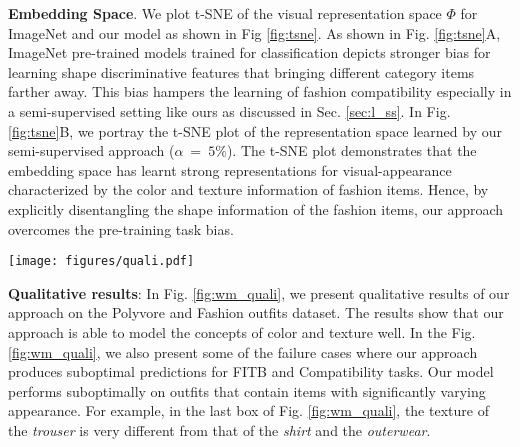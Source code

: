 \documentclass[sigconf]{acmart}
\begin{document}
\noindent \textbf{Embedding Space}. We plot t-SNE \cite{tsne} of the visual representation space $\Phi$ for ImageNet and our model as shown in Fig \ref{fig:tsne}. As shown in Fig. \ref{fig:tsne}{A}, ImageNet pre-trained models trained for classification depicts stronger bias for learning shape discriminative features that bringing different category items farther away. This bias hampers the learning of fashion compatibility especially in a semi-supervised setting like ours as discussed in Sec. \ref{sec:l_ss}. In Fig. \ref{fig:tsne}{B}, we portray the t-SNE plot of the representation space learned by our semi-supervised approach ($\alpha$~=~$5\%$). The t-SNE plot demonstrates that the embedding space has learnt strong representations for visual-appearance characterized by the color and texture information of fashion items. Hence, by explicitly disentangling the shape information of the fashion items, our approach overcomes the pre-training task bias. 

\begin{figure*}[t]
    \centering
    \texttt{[image: figures/quali.pdf]}
    \caption{{\bf Qualitative results on Polyvore and Fashion Outfits datasets}. \textbf{Top three rows} show the results on FITB task. Each box contains a query outfit and four candidate choices. Green and red boxes indicates correct and incorrect predictions of our model, respectively. \textbf{Bottom three rows} show the results on compatibility tasks. Some of the failure cases of our model are highlighted with a red box.}
    \label{fig:wm_quali}
\end{figure*}

\vspace{1mm}
\noindent \textbf{Qualitative results}: In Fig. \ref{fig:wm_quali}, we present qualitative results of our approach on the Polyvore and Fashion outfits dataset. The results show that our approach is able to model the concepts of color and texture well. In the Fig. \ref{fig:wm_quali}, we also present some of the failure cases where our approach produces suboptimal predictions for FITB and Compatibility tasks. Our model performs suboptimally on outfits that contain items with significantly varying appearance. For example, in the last box of Fig. \ref{fig:wm_quali}, the texture of the \textit{trouser} is very different from that of the \textit{shirt} and the \textit{outerwear}. 
\end{document}
